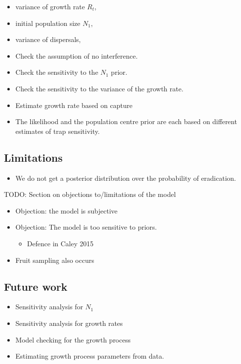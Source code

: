 \documentclass[
  oneside]{book}
\providecommand{\tightlist}{%
  \setlength{\itemsep}{0pt}\setlength{\parskip}{0pt}}
\begin{document}
\begin{itemize}
\item
  variance of growth rate \(R_t\),
\item
  initial population size \(N_1\),
\item
  variance of dispersals,
\item
  Check the assumption of no interference.
\item
  Check the sensitivity to the \(N_1\) prior.
\item
  Check the sensitivity to the variance of the growth rate.
\item
  Estimate growth rate based on capture
\item
  The likelihood and the population centre prior are each based on different estimates of trap sensitivity.
\end{itemize}

\hypertarget{limitations}{%
\subsection{Limitations}\label{limitations}}

\begin{itemize}
\tightlist
\item
  We do not get a posterior distribution over the probability of eradication.
\end{itemize}

TODO: Section on objections to/limitations of the model

\begin{itemize}
\tightlist
\item
  Objection: the model is subjective
\item
  Objection: The model is too sensitive to priors.

  \begin{itemize}
  \tightlist
  \item
    Defence in Caley 2015
  \end{itemize}
\item
  Fruit sampling also occurs
\end{itemize}

\hypertarget{future-work}{%
\subsection{Future work}\label{future-work}}

\begin{itemize}
\tightlist
\item
  Sensitivity analysis for \(N_1\)
\item
  Sensitivity analysis for growth rates
\item
  Model checking for the growth process
\item
  Estimating growth process parameters from data.
\end{itemize}
\end{document}
